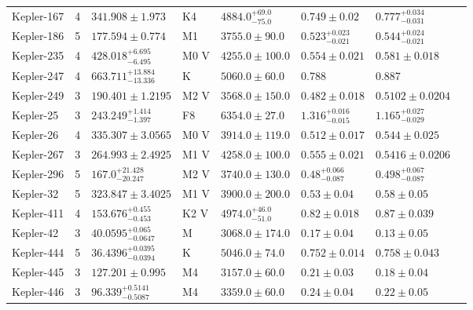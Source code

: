 \begin{tabular}{lrllllll}
Kepler-167 & 4 & $341.908 \pm 1.973$ & K4 & $4884.0^{+69.0}_{-75.0}$ & $0.749 \pm 0.02$ & $0.777^{+0.034}_{-0.031}$ & \cite{CHACHAN_ET_AL__2022} \\
Kepler-186 & 5 & $177.594 \pm 0.774$ & M1 & $3755.0 \pm 90.0$ & $0.523^{+0.023}_{-0.021}$ & $0.544^{+0.024}_{-0.021}$ & \cite{TORRES_ET_AL__2015} \\
Kepler-235 & 4 & $428.018^{+6.695}_{-6.495}$ & M0 V & $4255.0 \pm 100.0$ & $0.554 \pm 0.021$ & $0.581 \pm 0.018$ & \cite{ROWE_ET_AL__2014} \\
Kepler-247 & 4 & $663.711^{+13.884}_{-13.336}$ & K & $5060.0 \pm 60.0$ & 0.788 & 0.887 & \cite{FULTON__AMP__PETIGURA_2018} \\
Kepler-249 & 3 & $190.401 \pm 1.2195$ & M2 V & $3568.0 \pm 150.0$ & $0.482 \pm 0.018$ & $0.5102 \pm 0.0204$ & \cite{ROWE_ET_AL__2014} \\
Kepler-25 & 3 & $243.249^{+1.414}_{-1.397}$ & F8 & $6354.0 \pm 27.0$ & $1.316^{+0.016}_{-0.015}$ & $1.165^{+0.027}_{-0.029}$ & \cite{BOURRIER_ET_AL__2023} \\
Kepler-26 & 4 & $335.307 \pm 3.0565$ & M0 V & $3914.0 \pm 119.0$ & $0.512 \pm 0.017$ & $0.544 \pm 0.025$ & \cite{JONTOF_HUTTER_ET_AL__2016} \\
Kepler-267 & 3 & $264.993 \pm 2.4925$ & M1 V & $4258.0 \pm 100.0$ & $0.555 \pm 0.021$ & $0.5416 \pm 0.0206$ & \cite{ROWE_ET_AL__2014} \\
Kepler-296 & 5 & $167.0^{+21.428}_{-20.247}$ & M2 V & $3740.0 \pm 130.0$ & $0.48^{+0.066}_{-0.087}$ & $0.498^{+0.067}_{-0.087}$ & \cite{BARCLAY_ET_AL__2015} \\
Kepler-32 & 5 & $323.847 \pm 3.4025$ & M1 V & $3900.0 \pm 200.0$ & $0.53 \pm 0.04$ & $0.58 \pm 0.05$ & \cite{FABRYCKY_ET_AL__2012} \\
Kepler-411 & 4 & $153.676^{+0.455}_{-0.453}$ & K2 V & $4974.0^{+46.0}_{-51.0}$ & $0.82 \pm 0.018$ & $0.87 \pm 0.039$ & \cite{WANG_ET_AL__2014} \\
Kepler-42 & 3 & $40.0595^{+0.065}_{-0.0647}$ & M & $3068.0 \pm 174.0$ & $0.17 \pm 0.04$ & $0.13 \pm 0.05$ & \cite{MUIRHEAD_ET_AL__2012} \\
Kepler-444 & 5 & $36.4396^{+0.0395}_{-0.0394}$ & K & $5046.0 \pm 74.0$ & $0.752 \pm 0.014$ & $0.758 \pm 0.043$ & \cite{CAMPANTE_ET_AL__2015} \\
Kepler-445 & 3 & $127.201 \pm 0.995$ & M4 & $3157.0 \pm 60.0$ & $0.21 \pm 0.03$ & $0.18 \pm 0.04$ & \cite{MUIRHEAD_ET_AL__2015} \\
Kepler-446 & 3 & $96.339^{+0.5141}_{-0.5087}$ & M4 & $3359.0 \pm 60.0$ & $0.24 \pm 0.04$ & $0.22 \pm 0.05$ & \cite{MUIRHEAD_ET_AL__2015} \\

\end{tabular}

